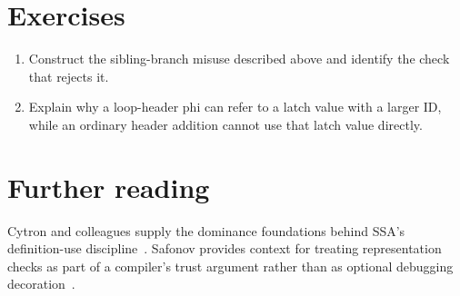 \section{Exercises}
\label{sec:pebble-eight-exercises}
\begin{enumerate}
\item \label{ex:pebble-welltyped-bad} Construct the sibling-branch misuse described above and identify the check that rejects it.
\item \label{ex:pebble-phi-use} Explain why a loop-header phi can refer to a latch value with a larger ID, while an ordinary header addition cannot use that latch value directly.
\end{enumerate}

\section{Further reading}
\label{sec:pebble-eight-reading}
Cytron and colleagues supply the dominance foundations behind SSA's definition-use discipline~\cite{cytron-1991-ssa}.
Safonov provides context for treating representation checks as part of a compiler's trust argument rather than as optional debugging decoration~\cite{safonov-2010-trustworthy}.
